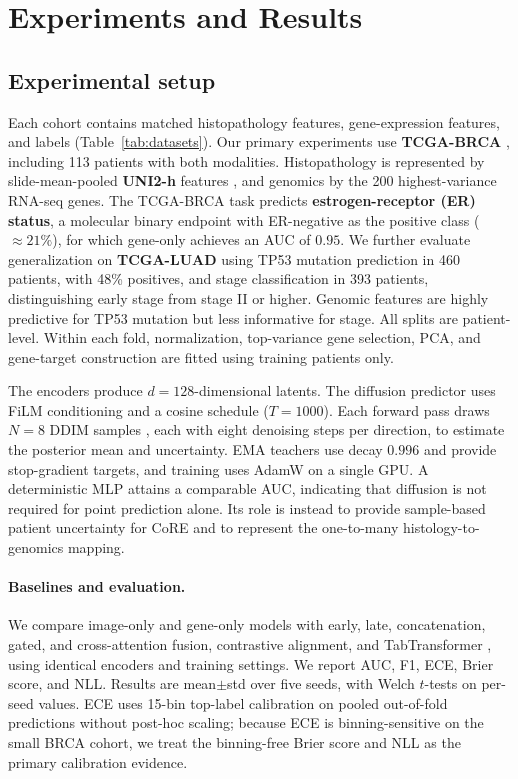 \section{Experiments and Results}
\label{sec:experiments}

\subsection{Experimental setup}
Each cohort contains matched histopathology features, gene-expression features, and labels (Table~\ref{tab:datasets}). Our primary experiments use \textbf{TCGA-BRCA} \cite{weinstein2013tcga}, including 113 patients with both modalities. Histopathology is represented by slide-mean-pooled \textbf{UNI2-h} features \cite{chen2024uni}, and genomics by the 200 highest-variance RNA-seq genes. The TCGA-BRCA task predicts \textbf{estrogen-receptor (ER) status}, a molecular
binary endpoint with ER-negative as the positive class ($\approx21\%$), for which gene-only achieves an AUC of $0.95$. We further evaluate generalization on \textbf{TCGA-LUAD} using TP53 mutation prediction in 460 patients, with 48\% positives, and stage classification in 393 patients, distinguishing early stage from stage II or higher. Genomic features are highly predictive for TP53 mutation but less informative for stage. All splits are patient-level. Within each fold, normalization, top-variance
gene selection, PCA, and gene-target construction are fitted using training
patients only.



The encoders produce $d{=}128$-dimensional latents. The diffusion predictor uses
FiLM conditioning and a cosine schedule ($T{=}1000$). Each forward pass draws
$N{=}8$ DDIM samples \cite{song2021ddim}, each with eight denoising steps per
direction, to estimate the posterior mean and uncertainty. EMA teachers use decay $0.996$ and
provide stop-gradient targets, and training uses AdamW on a single GPU. A
deterministic MLP attains a comparable AUC, indicating that diffusion is not
required for point prediction alone. Its role is instead to provide sample-based
patient uncertainty for CoRE and to represent the one-to-many
histology-to-genomics mapping.

\paragraph{Baselines and evaluation.}
We compare image-only and gene-only models with early, late, concatenation,
gated, and cross-attention fusion, contrastive alignment, and TabTransformer
\cite{huang2020tabtransformer}, using identical encoders and training settings.
We report AUC, F1, ECE, Brier score, and NLL. Results are mean$\pm$std over five
seeds, with Welch $t$-tests on per-seed values. ECE uses 15-bin top-label
calibration \cite{guo2017calibration} on pooled out-of-fold predictions without
post-hoc scaling; because ECE is binning-sensitive on the small BRCA cohort, we
treat the binning-free Brier score and NLL as the primary calibration evidence.
